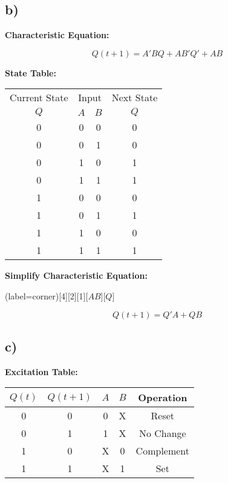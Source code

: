 \documentclass[a4paper,12pt]{article}
\begin{document}
\subsection*{b)}

\textbf{Characteristic Equation:}

\begin{equation*}
	Q(t+1) = A'BQ + AB'Q' + AB
\end{equation*}

\textbf{State Table:}

\begin{center}
	\begin{tabular}{cccc}
		\toprule
		Current State & \multicolumn{2}{c}{Input} & Next State \\
		\cmidrule(lr){1-1} \cmidrule(lr){2-3} \cmidrule(lr){4-4}
		$Q$ & $A$ & $B$ & $Q$ \\
		\midrule
		0 & 0 & 0 & 0 \\
		0 & 0 & 1 & 0 \\
		0 & 1 & 0 & 1 \\
		0 & 1 & 1 & 1 \\
		1 & 0 & 0 & 0 \\
		1 & 0 & 1 & 1 \\
		1 & 1 & 0 & 0 \\
		1 & 1 & 1 & 1 \\
		\bottomrule
	\end{tabular}
\end{center}

\newpage
\textbf{Simplify Characteristic Equation:}

\begin{center}
	\begin{karnaugh-map}(label=corner)[4][2][1][$AB$][$Q$]
		\autoterms[0]
	\end{karnaugh-map}
\end{center}

\begin{equation*}
	Q(t+1) = Q'A + QB
\end{equation*}

\subsection*{c)}

\textbf{Excitation Table:}

\begin{center}
	\begin{tabular}{ccccc}
		\toprule
		$Q(t)$ & $Q(t+1)$ & $A$ & $B$ & Operation \\
		\midrule
		0 & 0 & 0 & X & Reset \\
		0 & 1 & 1 & X & No Change \\
		1 & 0 & X & 0 & Complement \\
		1 & 1 & X & 1 & Set \\
		\bottomrule
	\end{tabular}
\end{center}
\end{document}
